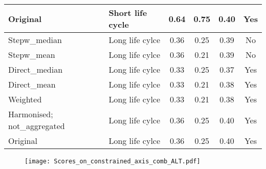\documentclass[../Draft_harmonization_paper.tex]{subfiles}
\begin{document}
\begin{table}[ht]
\begin{tabular}{llccc|c}
      Original & Short life cycle & 0.64 & 0.75 & 0.40 & Yes \\ 
      \midrule
      Stepw\_median & Long life cylce & 0.36 & 0.25 & 0.39 & No \\ 
      Stepw\_mean & Long life cylce & 0.36 & 0.21 & 0.39 & No \\
      Direct\_median & Long life cylce & 0.33 & 0.25 & 0.37 & Yes\\ 
      Direct\_mean & Long life cylce & 0.33 & 0.21 & 0.38 & Yes \\ 
      Weighted & Long life cylce & 0.33 & 0.21 & 0.38 & Yes \\ 
      Harmonised; not\_aggregated & Long life cylce & 0.36 & 0.25 & 0.40 & Yes \\ 
      Original & Long life cylce & 0.36 & 0.25 & 0.40 & Yes\\ 
    \bottomrule
    \end{tabular}
\end{table}

\begin{figure}[ht]
    \centering
    \texttt{[image: Scores\_on\_constrained\_axis\_comb\_ALT.pdf]}
\end{figure}
  \clearpage %
\label{fig:boxplots_scores_on_constrained_axis}
\end{document}
